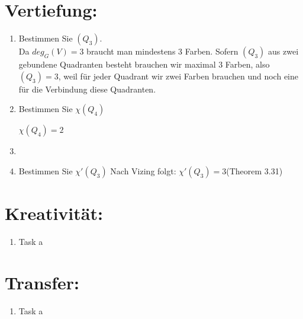 

\usepackage{ tipa }


    \maketitle
    \section*{Vertiefung:}
    \begin{enumerate}[label=(\alph*)]
        \item Bestimmen Sie \textchi$(Q_3 )$.\\
        Da $deg_G(V) = 3 $ braucht man mindestens 3 Farben. Sofern $(Q_3)$ aus zwei gebundene Quadranten besteht brauchen wir maximal 3 Farben, also \textchi$(Q_3) = 3$, weil für jeder Quadrant wir zwei Farben brauchen und noch eine für die Verbindung diese Quadranten.
                
        \item Bestimmen Sie $ \chi (Q_4) $
                
        $\chi (Q_4) = 2 $
                
        \item
               
        \item 
        Bestimmen Sie $\chi'(Q_3) $
        Nach Vizing folgt: $\chi'(Q_3) = 3 $(Theorem 3.31)
        
    \end{enumerate}
    \section*{Kreativität:}
    \begin{enumerate}[label=(\alph*)]
    	\item Task a
    \end{enumerate}
    \section*{Transfer:}
    \begin{enumerate}[label=(\alph*)]
    	\item Task a
    \end{enumerate}







